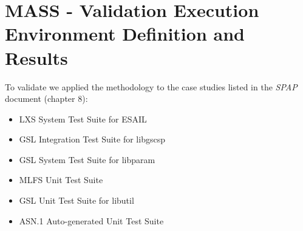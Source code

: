
\chapter{MASS - Validation Execution Environment Definition and Results}

\STARTCHANGEDFINAL

To validate \MASS we applied the methodology to the case studies listed in the \emph{SPAP} document (chapter 8):
\begin{itemize}
  \item LXS System Test Suite for ESAIL
  \item GSL Integration Test Suite for libgscsp
  \item GSL System Test Suite for libparam
  \item MLFS Unit Test Suite
  \item GSL Unit Test Suite for libutil
  \item ASN.1 Auto-generated Unit Test Suite
\end{itemize}


